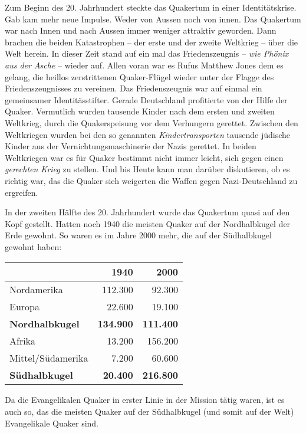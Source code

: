 \medskip

Zum Beginn des 20. Jahrhundert steckte das Quakertum in einer Identitätskrise.
Gab kam mehr neue Impulse. Weder von Aussen noch von innen. Das Quakertum war
nach Innen und nach Aussen immer weniger attraktiv geworden. Dann brachen die
beiden Katastrophen -- der erste und der zweite Weltkrieg -- über die Welt
herein. In dieser Zeit stand auf ein mal das Friedenszeugnis -- \textit{wie
Phönix aus der Asche} -- wieder auf. Allen voran war es Rufus Matthew Jones dem
es gelang, die heillos zerstrittenen Quaker-Flügel wieder unter der Flagge des
Friedenszeugnisses zu vereinen. Das Friedenszeugnis war auf einmal ein
gemeinsamer Identitässtifter. Gerade Deutschland profitierte von der Hilfe der
Quaker. Vermutlich wurden tausende Kinder nach dem ersten und zweiten Weltkrieg,
durch die Quakerspeisung vor dem Verhungern gerettet. Zwischen den Weltkriegen
wurden bei den so genannten \textit{Kindertransporten} tausende jüdische Kinder
aus der Vernichtungsmaschinerie der Nazis gerettet. In beiden Weltkriegen war es
für Quaker bestimmt nicht immer leicht, sich gegen einen \textit{gerechten
Krieg} zu stellen. Und bis Heute kann man darüber diskutieren, ob es richtig
war, das die Quaker sich weigerten die Waffen gegen Nazi-Deutschland zu
ergreifen.

\medskip

In der zweiten Hälfte des 20. Jahrhundert wurde das Quakertum quasi auf den Kopf
gestellt. Hatten noch 1940 die meisten Quaker auf der Nordhalbkugel der Erde
gewohnt. So waren es im Jahre 2000 mehr, die auf der Südhalbkugel gewohnt haben:

\begin{center}
\label{ref:tab_wortersetzungen}
\begin{tabular}{|l|r|r|} \hline
                        & \textbf{1940}        & \textbf{2000}    \\ \hline
\hline
Nordamerika             & 112.300              & 92.300           \\ \hline
Europa                  & 22.600               & 19.100           \\ \hline
\textbf{Nordhalbkugel}  & \textbf{134.900}     & \textbf{111.400} \\ \hline
Afrika                  & 13.200               & 156.200          \\ \hline
Mittel/Südamerika       & 7.200                & 60.600           \\ \hline
\textbf{Südhalbkugel}   & \textbf{20.400}      & \textbf{216.800} \\ \hline
\end{tabular}
\end{center}


Da die Evangelikalen Quaker in erster Linie in der Mission tätig waren, ist es
auch so, das die meisten Quaker auf der Südhalbkugel (und somit auf der Welt)
Evangelikale Quaker sind.